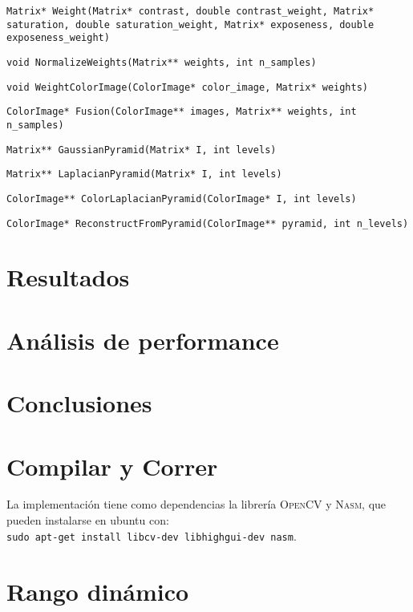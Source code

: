 \documentclass[a4paper,10pt]{article}
\begin{document}
            \texttt{Matrix* Weight(Matrix* contrast, double contrast\_weight, Matrix* saturation, double saturation\_weight, Matrix* exposeness, double exposeness\_weight)}

            \texttt{void NormalizeWeights(Matrix** weights, int n\_samples)}

            \texttt{void WeightColorImage(ColorImage* color\_image, Matrix* weights)}

            \texttt{ColorImage* Fusion(ColorImage** images, Matrix** weights, int n\_samples)}

            \texttt{Matrix** GaussianPyramid(Matrix* I, int levels)}

            \texttt{Matrix** LaplacianPyramid(Matrix* I, int levels)}

            \texttt{ColorImage** ColorLaplacianPyramid(ColorImage* I, int levels)}

            \texttt{ColorImage* ReconstructFromPyramid(ColorImage** pyramid, int n\_levels)}

    \section{Resultados}

    \section{Análisis de performance}

    \section{Conclusiones}
    
    \section{Compilar y Correr}
    
        La implementación tiene como dependencias la librería \textsc{OpenCV} y \textsc{Nasm}, que pueden instalarse en ubuntu con:\\
        \texttt{sudo apt-get install libcv-dev libhighgui-dev nasm}.

    \appendix

    \section{Rango dinámico}
\end{document}
